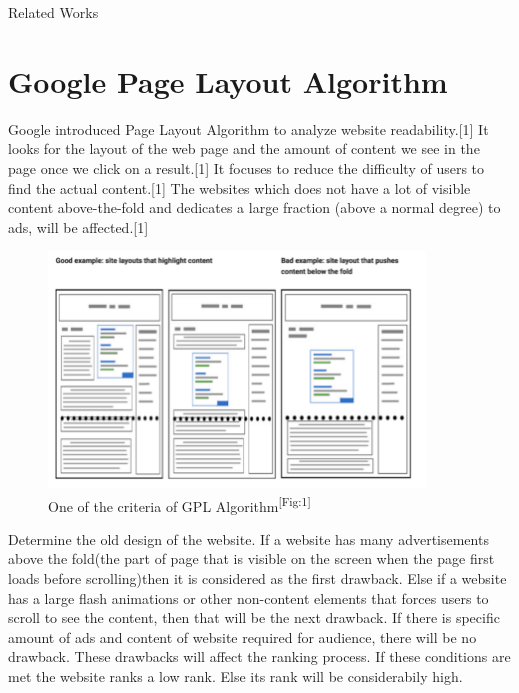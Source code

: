 \documentclass[11pt]{beamer}
\begin{document}
	\begin{frame}{Related Works}
			
		\section{Google Page Layout Algorithm}
		Google introduced Page Layout Algorithm to analyze website
		readability.[1] It looks for the layout of the web page and the amount of
		content we see in the page once we click on a result.[1] It focuses to reduce the difficulty of users to find the actual
		content.[1]
		The websites which does not have a lot of visible content
		above-the-fold and dedicates a large fraction (above a normal
		degree) to ads, will be affected.[1]
		\begin{figure}
			
			\includegraphics[width=10cm]{image/gpa.png}
			\caption{One of the criteria of GPL Algorithm\textsuperscript{[Fig:1]}}
			\label{fig1:gpa}
			
		\end{figure}
		
		
		Determine the old design of the website. If a website has many advertisements above the fold(the part of page that is visible on the screen when the page first loads before scrolling)then it is considered as the first drawback. Else if a website has a large flash animations or other non-content elements that forces users to scroll to see the content, then that will be the next drawback. If there is specific amount of ads and content of website required for audience, there will be no drawback. These drawbacks will affect the ranking process. If these conditions are met the website ranks a low rank. Else its rank will be considerabily high.
		
		
			
	
			
	\end{frame}
\end{document}
